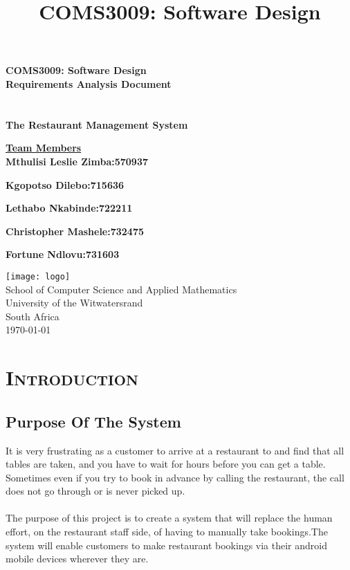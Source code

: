 \documentclass[15, notitlepage]{article}
\title{COMS3009: Software Design}
\begin{document}
\begin{titlepage}
	
		\hspace{0.5cm}
		\huge
		\textbf{COMS3009: Software Design}\\

		\vspace*{1cm}
		\Large
		\hspace{2cm}
		\textbf{Requirements Analysis Document}\\\\\\
		\vspace*{2cm}
		\normalsize
		\hspace{2.5cm}
		\textbf{The Restaurant Management System}

		\textbf{\underline{Team Members}}\\

		\textbf{Mthulisi Leslie Zimba:\hfill570937}

		\textbf{Kgopotso Dilebo:\hfill 715636}

		\textbf{Lethabo Nkabinde:\hfill 722211}

		\textbf{Christopher Mashele:\hfill 732475}
		
		\textbf{Fortune Ndlovu:\hfill 731603}

		\vspace{2cm}
		\normalsize
		\hspace{4cm}
		\texttt{[image: logo]}\\
		\hspace{3cm} School of Computer Science and Applied Mathematics\\
		\hspace{3cm}University of the Witwatersrand\\
		\hspace{3cm} South Africa\\
		\hspace{3cm} \today\\
	
\end{titlepage}

\section{\scshape{Introduction}}

\subsection{Purpose Of The System}
It is very frustrating as a customer to arrive at a restaurant to and find that all tables are taken, and you have to wait for hours before you can get a table. Sometimes even if you try to book in advance by calling the restaurant,  the call does not go through or is never picked up.\\\\
The purpose of this project is to create a system that will replace the human effort, on the restaurant staff side, of having to manually take bookings.The system will enable customers to make restaurant bookings via their android mobile devices wherever they are.
 
\end{document}
